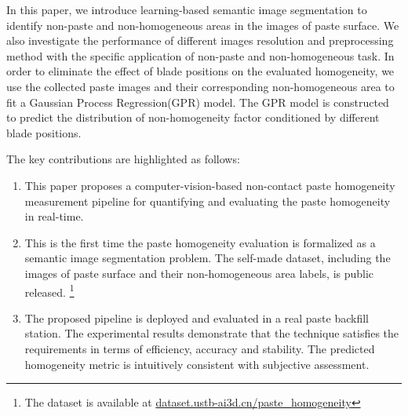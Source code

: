 \documentclass[pdflatex,sn-mathphys]{sn-jnl}%
\theoremstyle{thmstyleone}%
\theoremstyle{thmstyletwo}%
\theoremstyle{thmstylethree}%
\begin{document}
In this paper, we introduce learning-based semantic image segmentation to identify non-paste and non-homogeneous areas in the  images of paste surface.          
We also investigate the performance of different images resolution and preprocessing method with the specific application of non-paste and non-homogeneous task. 
In order to eliminate the effect of blade positions on the evaluated homogeneity, we use the collected paste images and their corresponding non-homogeneous area to fit a Gaussian Process Regression(GPR) model\cite{IJM-12-2021-1162}.
The GPR model is constructed to predict the  distribution of non-homogeneity factor conditioned by different blade positions.

The key contributions are highlighted as follows:
\begin{enumerate}
    \item This paper proposes a computer-vision-based non-contact paste homogeneity measurement pipeline for quantifying and evaluating the paste homogeneity in real-time.
    \item This is the first time the paste homogeneity evaluation is formalized as a semantic image segmentation problem. 
    The self-made dataset, including the images of paste surface and their non-homogeneous area labels, is public released. \footnote{The dataset is available at \url{dataset.ustb-ai3d.cn/paste_homogeneity}}
    
    \item The proposed pipeline is deployed and evaluated in a real paste backfill station. 
    The experimental results demonstrate that the technique satisfies the requirements in terms of efficiency, accuracy and stability. The predicted homogeneity metric is intuitively consistent with subjective assessment.
\end{enumerate}
\end{document}
